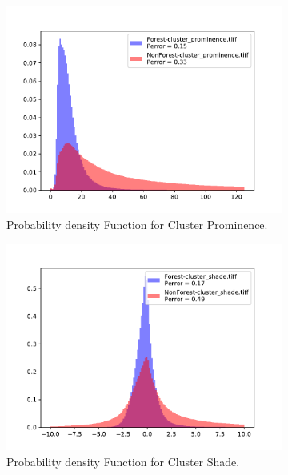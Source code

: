 \begin{figure}[H]
  \centering
  \begin{subfigure}[b]{0.4\linewidth}
    \includegraphics[width=\linewidth]{Chapter5/SENTINEL1/Coherence/cluster_prominence_histogram.pdf}
     \caption{Probability density Function for Cluster Prominence.}
  \end{subfigure}
  \centering
  \begin{subfigure}[b]{0.4\linewidth}
    \includegraphics[width=\linewidth]{Chapter5/SENTINEL1/Coherence/cluster_shade_histogram.pdf}
     \caption{Probability density Function for Cluster Shade.}
  \end{subfigure}
  \centering
  \begin{subfigure}[b]{0.4\linewidth}

\end{subfigure}
\end{figure}
